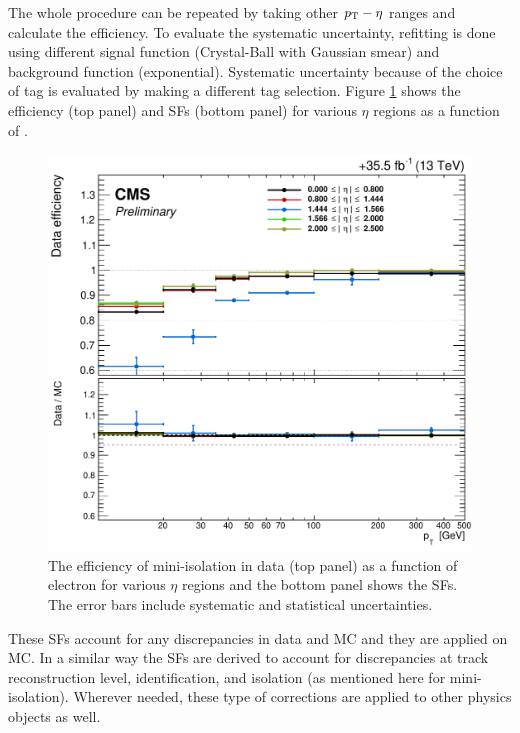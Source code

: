 The whole procedure can be repeated by taking other $p_{\mathrm{T}}-\eta$ ranges and calculate the efficiency. To evaluate the systematic uncertainty, refitting is done using different signal function (Crystal-Ball with Gaussian smear) and background function (exponential). Systematic uncertainty because of the choice of tag is evaluated by making a different tag selection. Figure \ref{fig:MiniIsoSF} shows the efficiency (top panel) and SFs (bottom panel) for various $\eta$ regions as a function of \pt.
\begin{figure}[h!]
\centering
\includegraphics[width=0.6\linewidth]{../Figures/Chap2/MiniIsoSF}
\captionsetup{width=.9\linewidth}
\caption[Mini-isolation efficiency and SF]{The efficiency of mini-isolation in data (top panel) as a function of electron \pt for various $\eta$ regions and the bottom panel shows the SFs. The error bars include systematic and statistical uncertainties.}
\label{fig:MiniIsoSF}
\end{figure}

These SFs account for any discrepancies in data and MC and they are applied on MC. In a similar way the SFs are derived to account for discrepancies at track reconstruction level, identification, and isolation (as mentioned here for mini-isolation). Wherever needed, these type of corrections are applied to other physics objects as well. 

 

